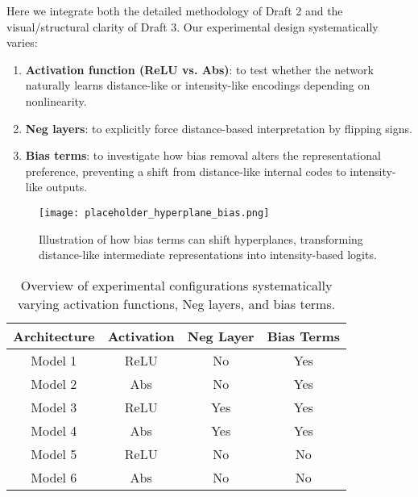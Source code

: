 Here we integrate both the detailed methodology of Draft 2 and the visual/structural clarity of Draft 3. Our experimental design systematically varies:
\begin{enumerate}
    \item \textbf{Activation function (ReLU vs. Abs)}: to test whether the network naturally learns distance-like or intensity-like encodings depending on nonlinearity.
    \item \textbf{Neg layers}: to explicitly force distance-based interpretation by flipping signs.
    \item \textbf{Bias terms}: to investigate how bias removal alters the representational preference, preventing a shift from distance-like internal codes to intensity-like outputs.
\end{enumerate}

\begin{figure}[ht]
    \centering
    \texttt{[image: placeholder\_hyperplane\_bias.png]}
    \caption{Illustration of how bias terms can shift hyperplanes, transforming distance-like intermediate representations into intensity-based logits.}
    \label{fig:hyperplane_bias}
\end{figure}

\begin{table}[ht]
\centering
\begin{tabular}{|c|c|c|c|}
\hline
\textbf{Architecture} & \textbf{Activation} & \textbf{Neg Layer} & \textbf{Bias Terms} \\
\hline
Model 1 & ReLU & No & Yes \\
Model 2 & Abs & No & Yes \\
Model 3 & ReLU & Yes & Yes \\
Model 4 & Abs & Yes & Yes \\
Model 5 & ReLU & No & No \\
Model 6 & Abs & No & No \\
\hline
\end{tabular}
\caption{Overview of experimental configurations systematically varying activation functions, Neg layers, and bias terms.}
\label{tab:architectures}
\end{table}

